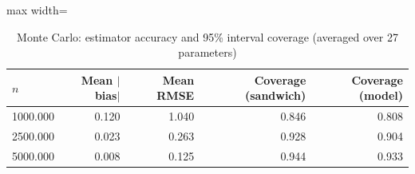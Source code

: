 \begin{table}[!htbp]\centering\small
\caption{Monte Carlo: estimator accuracy and 95\% interval coverage (averaged over 27 parameters)}\label{tab:mc_summary}
\begin{adjustbox}{max width=\textwidth}
\begin{tabular}{lrrrr}
\toprule
$n$ & Mean $|$bias$|$ & Mean RMSE & Coverage (sandwich) & Coverage (model)\\
\midrule
1000.000 & 0.120 & 1.040 & 0.846 & 0.808\\
2500.000 & 0.023 & 0.263 & 0.928 & 0.904\\
5000.000 & 0.008 & 0.125 & 0.944 & 0.933\\
\bottomrule
\end{tabular}
\end{adjustbox}
\end{table}
